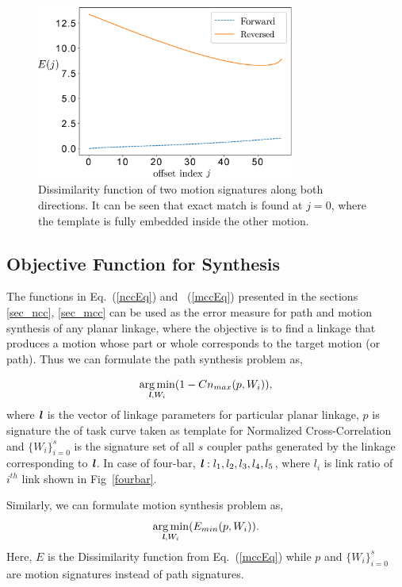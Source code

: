 \documentclass[twocolumn,10pt]{asme2e}
\newcommand{\req}[1]{(\ref{#1})}
\DeclareMathOperator*{\argminA}{arg\,min}
\begin{document}
\begin{figure}
\centering
\includegraphics[width=240pt]{figure/fig_mcc.eps}
  \caption{Dissimilarity function of two motion signatures along both directions. It can be seen that exact match is found at $j=0$, where the template is fully embedded inside the other motion.}
\label{mcc}
\end{figure}

\subsection{Objective Function for Synthesis}
The functions in Eq.~\req{nccEq} and ~\req{mccEq} presented in the sections \ref{sec_ncc}, \ref{sec_mcc} can be used as the error measure for path and motion synthesis of any planar linkage, where the objective is to find a linkage that produces a motion whose part or whole corresponds to the target motion (or path).
Thus we can formulate the path synthesis problem as,

\begin{equation}\label{objectiveFunPath}
  \argminA_{\textbf{\emph{l}}, W_i} (1 - Cn_{max}(p, W_i)),
\end{equation}
where $\textbf{\emph{l}}$ is the vector of linkage parameters for particular planar linkage, $p$ is signature the of task curve taken as template for Normalized Cross-Correlation and ${\{W_i\}}_{i=0}^{s}$ is the signature set of all $s$ coupler paths generated by the linkage corresponding to $\textbf{\emph{l}}$.
In case of four-bar, $\textbf{\emph{l}}: l_1, l_2, l_3, l_4, l_5$, where $l_i$ is link ratio of $i^{th}$ link shown in Fig~\ref{fourbar}.

Similarly, we can formulate motion synthesis problem as,
\begin{equation}\label{objectiveFunMotion}
  \argminA_{\textbf{\emph{l}}, W_i} (E_{min}(p, W_i)).
\end{equation}
Here, $E$ is the Dissimilarity function from Eq.~\req{mccEq} while $p$ and ${\{W_i\}}_{i=0}^{s}$ are motion signatures instead of path signatures.
\end{document}
